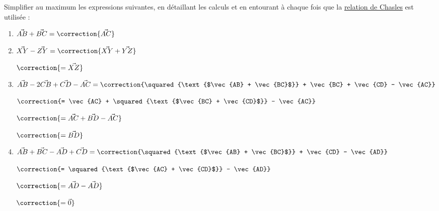 \documentclass[
	classe=$2^{de}$,
	landscape,
	twocolumn,
	headerTitle={Interrogation}
]{évaluation}
\begin{document}
\begin{exercice}
	Simplifier au maximum les expressions suivantes, en détaillant les calculs et en entourant à chaque fois que la \uline{relation de Chasles} est utilisée :

	\begin{enumerate}
		\item $\vec{AB} + \vec{BC} = \correction{\vec{AC}}$
		\item $\vec{XY} - \vec{ZY} = \correction{\vec{XY} + \vec{YZ}}$

		      $\correction{= \vec{XZ}}$
		\item $\vec{AB} - 2\vec{CB} + \vec{CD} - \vec{AC} = \correction{\squared{\text{$\vec{AB} + \vec{BC}$}} + \vec{BC} + \vec{CD} - \vec{AC}}$

		      $\correction{= \vec{AC} + \squared{\text{$\vec{BC} + \vec{CD}$}} - \vec{AC}}$

		      $\correction{= \vec{AC} + \vec{BD} - \vec{AC}}$

		      $\correction{= \vec{BD}}$
		\item $\vec{AB} + \vec{BC} - \vec{AD} + \vec{CD} = \correction{\squared{\text{$\vec{AB} + \vec{BC}$}} + \vec{CD} - \vec{AD}}$

		      $\correction{= \squared{\text{$\vec{AC} + \vec{CD}$}} - \vec{AD}}$

		      $\correction{= \vec{AD} - \vec{AD}}$

		      $\correction{= \vec{0}}$
	\end{enumerate}
\end{exercice}


\newpage

\setcounter{exercice}{1}
\maketitle
\end{document}
